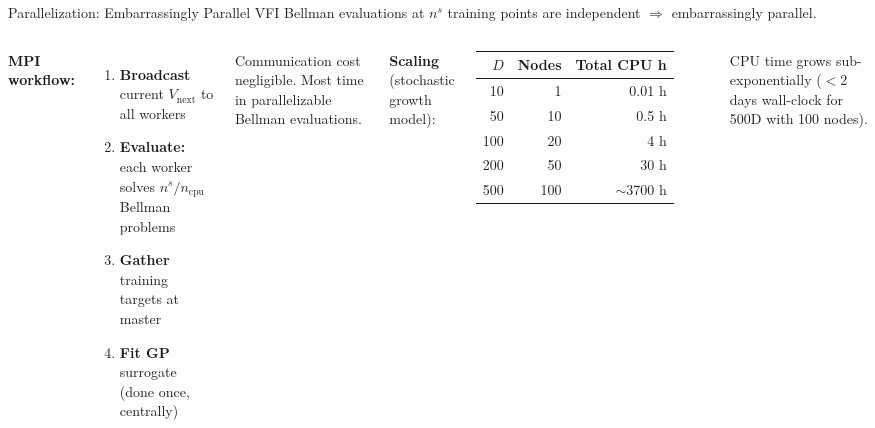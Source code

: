 \documentclass[aspectratio=169,11pt]{beamer}
\newcommand{\emphc}[1]{\textcolor{harvardcrimson}{#1}}
\begin{document}
\begin{frame}{Parallelization: Embarrassingly Parallel VFI}
\small
Bellman evaluations at $n^s$ training points are \emphc{independent} $\Rightarrow$ embarrassingly parallel.

\vspace{0.3em}
\begin{columns}[T]
\textbf{MPI workflow:}
\begin{enumerate}\itemsep1pt
    \item \textbf{Broadcast} current $V_{\text{next}}$ to all workers
    \item \textbf{Evaluate:} each worker solves $n^s / n_{\text{cpu}}$ Bellman problems
    \item \textbf{Gather} training targets at master
    \item \textbf{Fit GP} surrogate (done once, centrally)
\end{enumerate}

\vspace{0.2em}
Communication cost negligible. Most time in parallelizable Bellman evaluations.

\textbf{Scaling} (stochastic growth model):

\vspace{0.2em}
\scriptsize
\renewcommand{\arraystretch}{1.1}
\begin{tabular}{r r r}
\toprule
$D$ & Nodes & Total CPU h \\
\midrule
10 & 1 & 0.01 h \\
50 & 10 & 0.5 h \\
100 & 20 & 4 h \\
200 & 50 & 30 h \\
500 & 100 & $\sim$3700 h \\
\bottomrule
\end{tabular}

\vspace{0.3em}
\small
CPU time grows \emphc{sub-exponentially} ($<$2 days wall-clock for 500D with 100 nodes).
\end{columns}
\end{frame}
\end{document}
